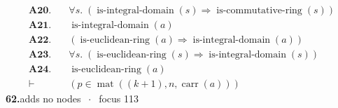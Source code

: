 \documentclass[11pt]{article}
\theoremstyle{plain}
\newcommand{\fit}[1]{\resizebox{\ifdim\width>\linewidth\linewidth\else\width\fi}{!}{#1}}
\begin{document}
\begin{align*}
  \mathbf{A20.}\quad & \forall s.\; (\operatorname{is\text{-}integral\text{-}domain}(s) \Rightarrow \operatorname{is\text{-}commutative\text{-}ring}(s)) \\
  \mathbf{A21.}\quad & \operatorname{is\text{-}integral\text{-}domain}(a) \\
  \mathbf{A22.}\quad & (\operatorname{is\text{-}euclidean\text{-}ring}(a) \Rightarrow \operatorname{is\text{-}integral\text{-}domain}(a)) \\
  \mathbf{A23.}\quad & \forall s.\; (\operatorname{is\text{-}euclidean\text{-}ring}(s) \Rightarrow \operatorname{is\text{-}integral\text{-}domain}(s)) \\
  \mathbf{A24.}\quad & \operatorname{is\text{-}euclidean\text{-}ring}(a) \\
  \vdash\quad & (p \in \operatorname{mat}((k + 1), n, \operatorname{carr}(a)))
\end{align*}
\medskip\noindent\textbf{62.}\quad \fit{\texttt{(ass)}}\hfill{\small adds no nodes $\;\cdot\;$ focus 113}\\[2pt]
\end{document}
